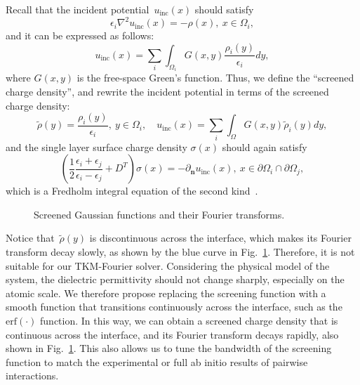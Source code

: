 \documentclass[prb,amsmath,amssymb, 10pt]{revtex4}
\begin{document}
Recall that the incident potential~$u_{\text{inc}}(x)$ should satisfy
\begin{equation}
    \epsilon_i \nabla^2 u_{\text{inc}}(x) = -\rho(x),~x \in \Omega_i,
\end{equation}
and it can be expressed as follows:
\begin{equation}
    u_{\text{inc}}(x) = \sum_{i} \int_{\Omega_i} G(x,y) \frac{\rho_i(y)}{\epsilon_i} dy,
\end{equation}
where $G(x, y)$ is the free-space Green's function.
Thus, we define the ``screened charge density'', and rewrite the incident potential in terms of the screened charge density:
\begin{equation}
    \tilde{\rho}(y) = \frac{\rho_i(y)}{\epsilon_i},~y \in \Omega_i, \quad u_{\text{inc}}(x) = \sum_{i} \int_{\Omega} G(x,y) \tilde{\rho}_i(y) dy,
\end{equation}
and the single layer surface charge density $\sigma(x)$ should again satisfy
\begin{equation}\label{eq:sl_equation}
    \left( \frac{1}{2} \frac{\epsilon_i + \epsilon_j}{\epsilon_i - \epsilon_j} + D^T \right) \sigma(x) = - \partial_{\mathbf{n}} u_{\text{inc}}(x),~x \in \partial \Omega_i \cap \partial \Omega_j,
\end{equation}
which is a Fredholm integral equation of the second kind~\cite{greengard1994numerical}.

\begin{figure}[htbp]
    \centering
    
    \caption{Screened Gaussian functions and their Fourier transforms.}
    \label{fig:screened_gauss_ft}
\end{figure}

Notice that~$\tilde{\rho}(y)$ is discontinuous across the interface, which makes its Fourier transform decay slowly, as shown by the blue curve in Fig.~\ref{fig:screened_gauss_ft}. Therefore, it is not suitable for our TKM-Fourier solver.
Considering the physical model of the system, the dielectric permittivity should not change sharply, especially on the atomic scale. We therefore propose replacing the screening function with a smooth function that transitions continuously across the interface, such as the $\text{erf}(\cdot)$ function.
In this way, we can obtain a screened charge density that is continuous across the interface, and its Fourier transform decays rapidly, also shown in Fig.~\ref{fig:screened_gauss_ft}.
This also allows us to tune the bandwidth of the screening function to match the experimental or full ab initio results of pairwise interactions.
\end{document}
